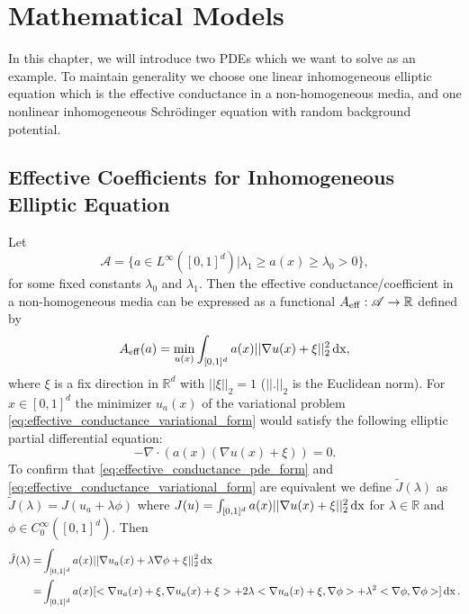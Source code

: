 \chapter{Mathematical Models}
In this chapter, we will introduce two PDEs which we want to solve as an example. To maintain generality we choose one linear inhomogeneous elliptic equation which is the effective conductance in a non-homogeneous media, and one nonlinear inhomogeneous Schr\"{o}dinger equation with random background potential.
\section{Effective Coefficients for Inhomogeneous Elliptic Equation}\label{section_ECIM}
Let 
\begin{equation}
	\label{def:coefficient_field_for_effective_conductance}
	\mathscr{A} = \{a\in L^{\infty}([0,1]^d) | \lambda_{1} \geq a(x) \geq \lambda_{0} > 0 \},
\end{equation}
for some fixed constants $\lambda_{0}$ and $\lambda_{1}$. Then the effective conductance/coefficient in a non-homogeneous media can be expressed as a functional $A_{\operatorname{eff}} : \mathscr{A} \to \mathbb{R}$ defined by
\begin{equation}
	A_{\operatorname{eff}}(a) = \min_{u(x)} \int_{[0,1]^d} a(x) ||\nabla u(x) + \xi||_{2}^{2} \operatorname{dx}
	\label{eq:effective_conductance_variational_form},
\end{equation}
where $\xi$ is a fix direction in $\mathbb{R}^d$ with $||\xi||_{2} = 1$ ($||.||_{2}$ is the Euclidean norm).
For $x\in [0,1]^{d}$ the minimizer $u_{a}(x)$ of the variational problem \eqref{eq:effective_conductance_variational_form} would satisfy the following elliptic partial differential equation: 
\begin{equation}
	-\nabla \cdot (a(x)(\nabla u(x)+\xi)) = 0 
	\label{eq:effective_conductance_pde_form}.
\end{equation}
To confirm that \eqref{eq:effective_conductance_pde_form} and \eqref{eq:effective_conductance_variational_form} are equivalent we define $\tilde{J}(\lambda)$ as $\tilde{J}(\lambda) = J(u_{a}+\lambda\phi)$ where $J(u) = \int_{[0,1]^d} a(x) ||\nabla u(x) + \xi||_{2}^{2} \operatorname{dx} $ for $\lambda \in \mathbb{R}$ and $\phi \in C_{0}^{\infty}([0,1]^{d})$. Then 
\begin{equation}
	\begin{aligned}
		\tilde{J}(\lambda) = &\int_{[0,1]^d} a(x) ||\nabla u_{a}(x)+ \lambda\nabla\phi + \xi||_{2}^{2} \operatorname{dx} \\
		= &\int_{[0,1]^d} a(x) [<\nabla u_{a}(x)+\xi,\nabla u_{a}(x)+\xi> + 2\lambda<\nabla u_{a}(x)+\xi, \nabla\phi> + \lambda^{2} <\nabla\phi,\nabla\phi>] \operatorname{dx}.
	\end{aligned}\label{eq:Jtilda}
\end{equation}
